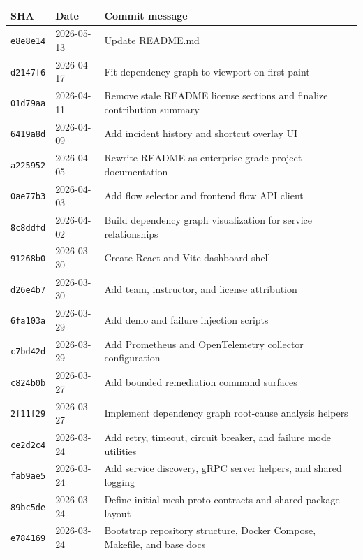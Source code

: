\documentclass[11pt,letterpaper]{article}
\newcommand{\subhead}[1]{%
  \par\vspace{6pt}{\bfseries\color{InkBlack}#1}\par\vspace{2pt}
}
\begin{document}
\subhead{Commit log (17 commits on \texttt{main})}
\small
\begin{tabular}{@{}lll@{}}
\toprule
\textbf{SHA} & \textbf{Date} & \textbf{Commit message} \\
\midrule
\texttt{e8e8e14} & 2026-05-13 & Update README.md \\
\texttt{d2147f6} & 2026-04-17 & Fit dependency graph to viewport on first paint \\
\texttt{01d79aa} & 2026-04-11 & Remove stale README license sections and finalize contribution summary \\
\texttt{6419a8d} & 2026-04-09 & Add incident history and shortcut overlay UI \\
\texttt{a225952} & 2026-04-05 & Rewrite README as enterprise-grade project documentation \\
\texttt{0ae77b3} & 2026-04-03 & Add flow selector and frontend flow API client \\
\texttt{8c8ddfd} & 2026-04-02 & Build dependency graph visualization for service relationships \\
\texttt{91268b0} & 2026-03-30 & Create React and Vite dashboard shell \\
\texttt{d26e4b7} & 2026-03-30 & Add team, instructor, and license attribution \\
\texttt{6fa103a} & 2026-03-29 & Add demo and failure injection scripts \\
\texttt{c7bd42d} & 2026-03-29 & Add Prometheus and OpenTelemetry collector configuration \\
\texttt{c824b0b} & 2026-03-27 & Add bounded remediation command surfaces \\
\texttt{2f11f29} & 2026-03-27 & Implement dependency graph root-cause analysis helpers \\
\texttt{ce2d2c4} & 2026-03-24 & Add retry, timeout, circuit breaker, and failure mode utilities \\
\texttt{fab9ae5} & 2026-03-24 & Add service discovery, gRPC server helpers, and shared logging \\
\texttt{89bc5de} & 2026-03-24 & Define initial mesh proto contracts and shared package layout \\
\texttt{e784169} & 2026-03-24 & Bootstrap repository structure, Docker Compose, Makefile, and base docs \\
\bottomrule
\end{tabular}
\normalsize
\end{document}
